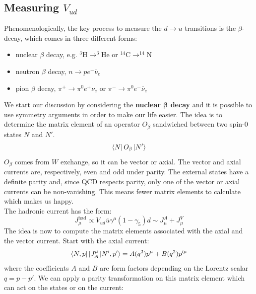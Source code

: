 \documentclass[../main.tex]{subfiles}
\begin{document}
\subsection{Measuring $V_{ud}$}
Phenomenologically, the key process to measure the $d\to u$ transitions is the $\beta$-decay, which comes in three different forms:
\begin{itemize}
    \item nuclear $\beta$ decay, e.g. $^3$H$\to^3$He or $^{14}$C$\to^{14}$N
    \item neutron $\beta$ decay, $n\to pe^-\overline{\nu}_e$
    \item pion $\beta$ decay, $\pi^+\to\pi^0e^+\nu_e$ or $\pi^-\to\pi^0e^-\overline{\nu}_e$
\end{itemize}
We start our discussion by considering the \textbf{nuclear $\mathbf{\beta}$ decay} and it is possible to use symmetry arguments in order to make our life easier. The idea is to determine the matrix element of an operator $O_\beta$ sandwiched between two spin-0 states $N$ and $N'$.
\[
\bra{N}O_\beta\ket{N'}
\]
$O_\beta$ comes from $W$ exchange, so it can be vector or axial. The vector and axial currents are, respectively, even and odd under parity. The external states have a definite parity and, since QCD respects parity, only one of the vector or axial currents can be non-vanishing. This means fewer matrix elements to calculate which makes us happy. \\
The hadronic current has the form:
\[
J_\mu^{\text{had}}\propto V_{ud}\overline{u}\gamma^\mu(1-\gamma_5)d\sim J_\mu^A+J_\mu^V
\]
The idea is now to compute the matrix elements associated with the axial and the vector current. Start with the axial current:
\[
\bra{N,p}|J_A^\mu\ket{N',p'}=A(q^2)p^\mu+B(q^2)p'^\mu
\]
where the coefficients $A$ and $B$ are form factors depending on the Lorentz scalar $q=p-p'$.
We can apply a parity transformation on this matrix element which can act on the states or on the current:
\end{document}
